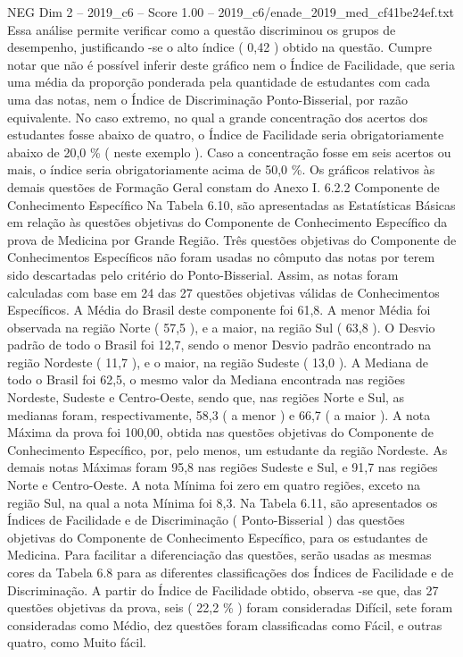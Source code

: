 \begin{textsample}{NEG Dim 2 – 2019\_c6 – Score 1.00 – 2019\_c6/enade\_2019\_med\_cf41be24ef.txt}
Essa análise permite verificar como a questão discriminou os grupos de desempenho, justificando -se o alto índice ( 0,42 ) obtido na questão.
Cumpre notar que não é possível inferir deste gráfico nem o Índice de Facilidade, que seria uma média da proporção ponderada pela quantidade de estudantes com cada uma das notas, nem o Índice de Discriminação Ponto-Bisserial, por razão equivalente.
No caso extremo, no qual a grande concentração dos acertos dos estudantes fosse abaixo de quatro, o Índice de Facilidade seria obrigatoriamente abaixo de 20,0 \% ( neste exemplo ).
Caso a concentração fosse em seis acertos ou mais, o índice seria obrigatoriamente acima de 50,0 \%.
Os gráficos relativos às demais questões de Formação Geral constam do Anexo I. 6.2.2 Componente de Conhecimento Específico Na Tabela 6.10, são apresentadas as Estatísticas Básicas em relação às questões objetivas do Componente de Conhecimento Específico da prova de Medicina por Grande Região.
Três questões objetivas do Componente de Conhecimentos Específicos não foram usadas no cômputo das notas por terem sido descartadas pelo critério do Ponto-Bisserial.
Assim, as notas foram calculadas com base em 24 das 27 questões objetivas válidas de Conhecimentos Específicos.
A Média do Brasil deste componente foi 61,8.
A menor Média foi observada na região Norte ( 57,5 ), e a maior, na região Sul ( 63,8 ).
O Desvio padrão de todo o Brasil foi 12,7, sendo o menor Desvio padrão encontrado na região Nordeste ( 11,7 ), e o maior, na região Sudeste ( 13,0 ).
A Mediana de todo o Brasil foi 62,5, o mesmo valor da Mediana encontrada nas regiões Nordeste, Sudeste e Centro-Oeste, sendo que, nas regiões Norte e Sul, as medianas foram, respectivamente, 58,3 ( a menor ) e 66,7 ( a maior ).
A nota Máxima da prova foi 100,00, obtida nas questões objetivas do Componente de Conhecimento Específico, por, pelo menos, um estudante da região Nordeste.
As demais notas Máximas foram 95,8 nas regiões Sudeste e Sul, e 91,7 nas regiões Norte e Centro-Oeste.
A nota Mínima foi zero em quatro regiões, exceto na região Sul, na qual a nota Mínima foi 8,3.
Na Tabela 6.11, são apresentados os Índices de Facilidade e de Discriminação ( Ponto-Bisserial ) das questões objetivas do Componente de Conhecimento Específico, para os estudantes de Medicina.
Para facilitar a diferenciação das questões, serão usadas as mesmas cores da Tabela 6.8 para as diferentes classificações dos Índices de Facilidade e de Discriminação.
A partir do Índice de Facilidade obtido, observa -se que, das 27 questões objetivas da prova, seis ( 22,2 \% ) foram consideradas Difícil, sete foram consideradas como Médio, dez questões foram classificadas como Fácil, e outras quatro, como Muito fácil.

\end{textsample}
